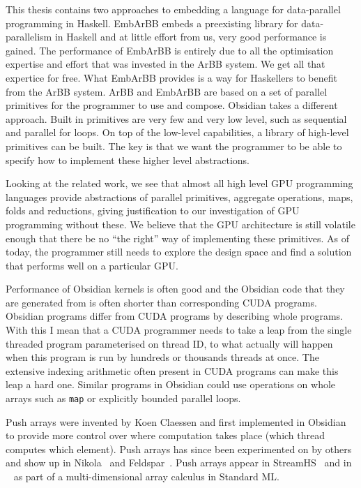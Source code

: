 \documentclass[a4paper]{book}
\begin{document}


This thesis contains two approaches to embedding a language for data-parallel programming 
in Haskell. EmbArBB embeds a preexisting library for data-parallelism in Haskell 
and at little effort from us, very good performance is gained. The performance of 
EmbArBB is entirely due to all the optimisation expertise and effort that was invested in 
the ArBB system. We get all that expertice for free. What EmbArBB provides is a 
way for Haskellers to benefit from the ArBB system. ArBB and EmbArBB are based on a 
set of parallel primitives for the programmer to use and compose. Obsidian takes 
a different approach. Built in primitives are very few and very low level, such as 
sequential and parallel for loops. On top of the low-level capabilities, a library 
of high-level primitives can be built. The key is that we want the programmer to 
be able to specify how to implement these higher level abstractions. 

Looking at the related work, we see that almost all high level GPU programming 
languages provide abstractions of parallel primitives, aggregate operations, 
maps, folds and reductions, giving justification to our investigation of GPU 
programming without these. We believe that the GPU architecture is still volatile 
enough that there be no ``the right'' way of implementing these primitives. As of 
today, the programmer still needs to explore the design space and find a solution 
that performs well on a particular GPU. 

Performance of Obsidian kernels is often good and the Obsidian code that they 
are generated from is often shorter than corresponding CUDA programs. Obsidian 
programs differ from CUDA programs by describing whole programs. With this I mean 
that a CUDA programmer needs to take a leap from the single threaded program 
parameterised on thread ID, to what actually will happen when this program is 
run by hundreds or thousands threads at once. The extensive indexing arithmetic 
often present in CUDA programs can make this leap a hard one. Similar programs 
in Obsidian could use operations on whole arrays such as {\tt map} or explicitly 
bounded parallel loops. 

Push arrays were invented by Koen Claessen and first implemented in Obsidian 
to provide more control over where computation takes place (which thread computes 
which element). Push arrays has since been experimented on by others and show up 
in Nikola~\citet{NIKOLAPUSH} and Feldspar~\citet{FELDSPARPUSH}. Push arrays appear 
in StreamHS~\citet{FPCDSL} and in ~\citet{MOA} as part of a multi-dimensional array 
calculus in Standard ML. 
\end{document}
